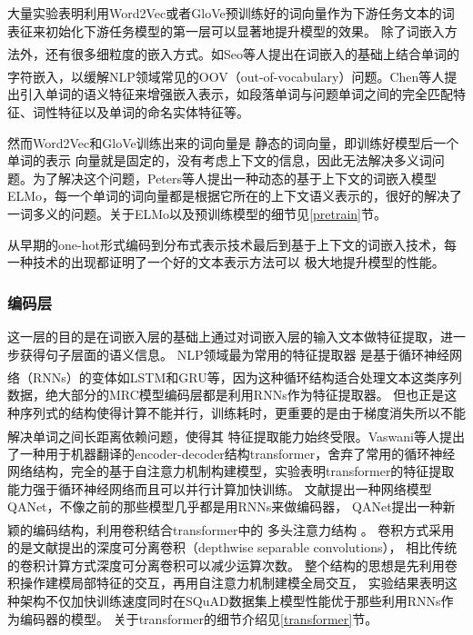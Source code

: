 \documentclass{article}
\newcommand{\upcite}[1]{\textsuperscript{\textsuperscript{\cite{#1}}}}
\begin{document}
大量实验表明利用Word2Vec或者GloVe预训练好的词向量作为下游任务文本的词表征来初始化下游任务模型的第一层可以显著地提升模型的效果。
除了词嵌入方法外，还有很多细粒度的嵌入方式。如Seo等人\upcite{BiDAF}提出在词嵌入的基础上结合单词的字符嵌入，以缓解NLP领域常见的OOV（out-of-vocabulary）问题。Chen等人\upcite{DrQA}提出引入单词的语义特征来增强嵌入表示，如段落单词与问题单词之间的完全匹配特征、词性特征以及单词的命名实体特征等。

然而Word2Vec和GloVe训练出来的词向量是
静态的词向量，即训练好模型后一个单词的表示
向量就是固定的，没有考虑上下文的信息，因此无法解决多义词问题。为了解决这个问题，Peters等人\cite{ELMo}提出一种动态的基于上下文的词嵌入模型ELMo，每一个单词的词向量都是根据它所在的上下文语义表示的，很好的解决了一词多义的问题。关于ELMo以及预训练模型的细节见\ref{pretrain}节。

从早期的one-hot形式编码到分布式表示技术最后到基于上下文的词嵌入技术，每一种技术的出现都证明了一个好的文本表示方法可以
极大地提升模型的性能。
\subsubsection{编码层}
这一层的目的是在词嵌入层的基础上通过对词嵌入层的输入文本做特征提取，进一步获得句子层面的语义信息。
NLP领域最为常用的特征提取器
是基于循环神经网络（RNNs）的变体如LSTM\upcite{LSTM}和GRU\upcite{GRU}等，因为这种循环结构适合处理文本这类序列数据，绝大部分的MRC模型编码层都是利用RNNs作为特征提取器。
但也正是这种序列式的结构使得计算不能并行，训练耗时，更重要的是由于梯度消失所以不能解决单词之间长距离依赖问题，使得其
特征提取能力始终受限。Vaswani等人\upcite{Transformer}提出了一种用于机器翻译的encoder-decoder结构transformer，舍弃了常用的循环神经网络结构，完全的基于自注意力机制构建模型，实验表明transformer的特征提取能力强于循环神经网络而且可以并行计算加快训练。
文献\cite{QANet}提出一种网络模型QANet，不像之前的那些模型几乎都是用RNNs来做编码器，
QANet提出一种新颖的编码结构，利用卷积结合transformer\upcite{Transformer}中的
多头注意力结构
。
卷积方式采用的是文献\cite{DSC}提出的深度可分离卷积（depthwise 
separable convolutions），
相比传统的卷积计算方式深度可分离卷积可以减少运算次数。
整个结构的思想是先利用卷积操作建模局部特征的交互，再用自注意力机制建模全局交互，
实验结果表明这种架构不仅加快训练速度同时在SQuAD数据集上模型性能优于那些利用RNNs作为编码器的模型。
关于transformer的细节介绍见\ref{transformer}节。


\end{document}

